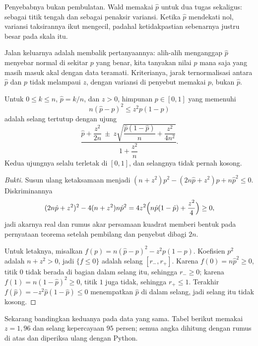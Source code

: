 Penyebabnya bukan pembulatan. Wald memakai $\hat p$ untuk dua tugas sekaligus:
sebagai titik tengah dan sebagai penaksir variansi. Ketika $\hat p$ mendekati nol,
variansi taksirannya ikut mengecil, padahal ketidakpastian sebenarnya justru besar pada
skala itu.

Jalan keluarnya adalah membalik pertanyaannya: alih-alih menganggap $\hat p$ menyebar
normal di sekitar $p$ yang benar, kita tanyakan nilai $p$ mana saja yang masih masuk
akal dengan data teramati. Kriterianya, jarak ternormalisasi antara $\hat p$ dan $p$
tidak melampaui $z$, dengan variansi di penyebut memakai $p$, bukan $\hat p$.


\begin{teorema}
Untuk $0\le k\le n$, $\hat p=k/n$, dan $z>0$, himpunan $p\in[0,1]$ yang memenuhi
\[
n(\hat p-p)^2\le z^2p(1-p)
\]
adalah selang tertutup dengan ujung
\[
\frac{\hat p+\dfrac{z^2}{2n}\ \pm\
z\sqrt{\dfrac{\hat p(1-\hat p)}{n}+\dfrac{z^2}{4n^2}}}{1+\dfrac{z^2}{n}} .
\]
Kedua ujungnya selalu terletak di $[0,1]$, dan selangnya tidak pernah kosong.
\end{teorema}

\begin{proof}[Bukti]
Susun ulang ketaksamaan menjadi $(n+z^2)p^2-(2n\hat p+z^2)p+n\hat p^2\le0$.
Diskriminannya
\[
(2n\hat p+z^2)^2-4(n+z^2)n\hat p^2
=4z^2\Bigl(n\hat p(1-\hat p)+\frac{z^2}{4}\Bigr)\ge0,
\]
jadi akarnya real dan rumus akar persamaan kuadrat memberi bentuk pada pernyataan
teorema setelah pembilang dan penyebut dibagi $2n$.

Untuk letaknya, misalkan $f(p)=n(\hat p-p)^2-z^2p(1-p)$. Koefisien $p^2$ adalah
$n+z^2>0$, jadi $\{f\le0\}$ adalah selang $[r_-,r_+]$. Karena
$f(0)=n\hat p^2\ge0$, titik $0$ tidak berada di bagian dalam selang itu, sehingga
$r_-\ge0$; karena $f(1)=n(1-\hat p)^2\ge0$, titik $1$ juga tidak, sehingga
$r_+\le1$. Terakhir $f(\hat p)=-z^2\hat p(1-\hat p)\le0$ menempatkan $\hat p$ di dalam
selang, jadi selang itu tidak kosong.
\end{proof}

Sekarang bandingkan keduanya pada data yang sama. Tabel berikut memakai $z=1{,}96$ dan
selang kepercayaan $95$ persen; semua angka dihitung dengan rumus di atas dan diperiksa
ulang dengan Python.


